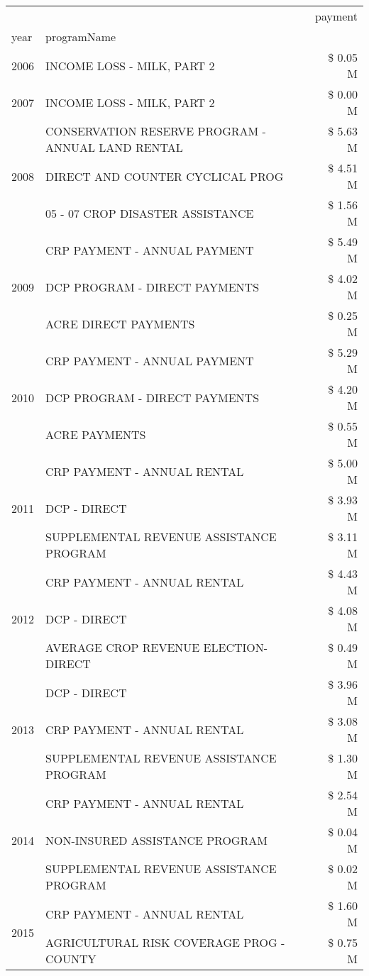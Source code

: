 \begin{tabular}{llr}
\toprule
 &  & payment \\
year & programName &  \\
\midrule
2006 & INCOME LOSS - MILK, PART 2 & \$ 0.05 M \\
\cline{1-3}
2007 & INCOME LOSS - MILK, PART 2 & \$ 0.00 M \\
\cline{1-3}
\multirow[t]{3}{*}{2008} & CONSERVATION RESERVE PROGRAM - ANNUAL LAND RENTAL & \$ 5.63 M \\
 & DIRECT AND COUNTER CYCLICAL PROG & \$ 4.51 M \\
 & 05 - 07 CROP DISASTER ASSISTANCE & \$ 1.56 M \\
\cline{1-3}
\multirow[t]{3}{*}{2009} & CRP PAYMENT - ANNUAL PAYMENT & \$ 5.49 M \\
 & DCP PROGRAM - DIRECT PAYMENTS & \$ 4.02 M \\
 & ACRE DIRECT PAYMENTS & \$ 0.25 M \\
\cline{1-3}
\multirow[t]{3}{*}{2010} & CRP PAYMENT - ANNUAL PAYMENT & \$ 5.29 M \\
 & DCP PROGRAM - DIRECT PAYMENTS & \$ 4.20 M \\
 & ACRE PAYMENTS & \$ 0.55 M \\
\cline{1-3}
\multirow[t]{3}{*}{2011} & CRP PAYMENT - ANNUAL RENTAL & \$ 5.00 M \\
 & DCP - DIRECT & \$ 3.93 M \\
 & SUPPLEMENTAL REVENUE ASSISTANCE PROGRAM & \$ 3.11 M \\
\cline{1-3}
\multirow[t]{3}{*}{2012} & CRP PAYMENT - ANNUAL RENTAL & \$ 4.43 M \\
 & DCP - DIRECT & \$ 4.08 M \\
 & AVERAGE CROP REVENUE ELECTION-DIRECT & \$ 0.49 M \\
\cline{1-3}
\multirow[t]{3}{*}{2013} & DCP - DIRECT & \$ 3.96 M \\
 & CRP PAYMENT - ANNUAL RENTAL & \$ 3.08 M \\
 & SUPPLEMENTAL REVENUE ASSISTANCE PROGRAM & \$ 1.30 M \\
\cline{1-3}
\multirow[t]{3}{*}{2014} & CRP PAYMENT - ANNUAL RENTAL & \$ 2.54 M \\
 & NON-INSURED ASSISTANCE PROGRAM & \$ 0.04 M \\
 & SUPPLEMENTAL REVENUE ASSISTANCE PROGRAM & \$ 0.02 M \\
\cline{1-3}
\multirow[t]{3}{*}{2015} & CRP PAYMENT - ANNUAL RENTAL & \$ 1.60 M \\
 & AGRICULTURAL RISK COVERAGE PROG - COUNTY & \$ 0.75 M \\

\end{tabular}
